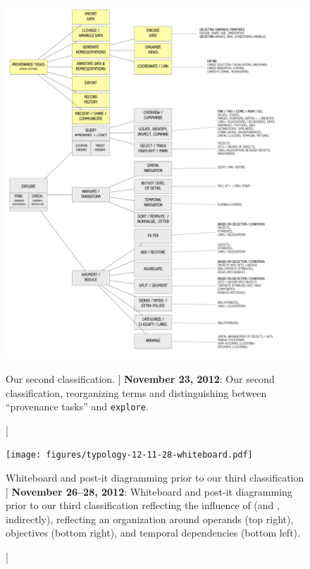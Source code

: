 \begin{figure}
	\centering
	\includegraphics[width=\textwidth]{figures/typology-12-11-23.pdf}
	\caption
	[
	    Our second classification.
	]
	{
	    {\bf November 23, 2012}: Our second classification, reorganizing terms and distinguishing between ``provenance tasks'' and {\tt explore}.
	}
	\centering
	\label{app:typology:fig:12.11.23}
\end{figure}



\begin{figure}
	\centering
	\texttt{[image: figures/typology-12-11-28-whiteboard.pdf]}
	\caption
	[
	    Whiteboard and post-it diagramming prior to our third classification
	]
	{
	    {\bf November 26--28, 2012}: Whiteboard and post-it diagramming prior to our third classification reflecting the influence of \citet{Roth2012} (and \citet{Norman1988}, indirectly), reflecting an organization around operands (top right), objectives (bottom right), and temporal dependencies (bottom left).
	}
	\centering
	\label{app:typology:fig:12.11.28-whiteboard}
\end{figure}

